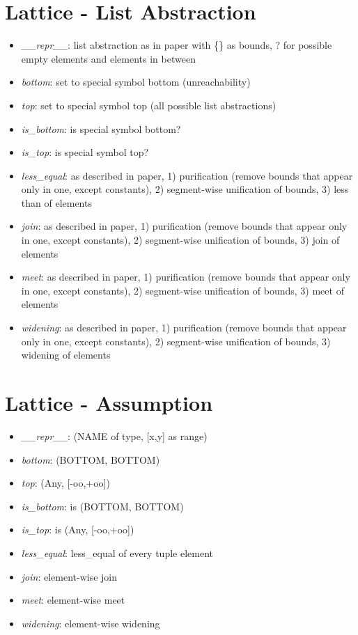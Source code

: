 \documentclass[11pt]{article}
\begin{document}
\section{Lattice - List Abstraction}

\begin{itemize}
\item \textit{\_\_repr\_\_}: list abstraction as in paper with \{\} as bounds, ? for possible empty elements and elements in between
\item \textit{bottom}: set to special symbol bottom (unreachability)
\item \textit{top}: set to special symbol top (all possible list abstractions)
\item \textit{is\_bottom}: is special symbol bottom?
\item \textit{is\_top}: is special symbol top?
\item \textit{less\_equal}: as described in paper, 1) purification (remove bounds that appear only in one, except constants), 2) segment-wise unification of bounds, 3) less than of elements
\item \textit{join}: as described in paper, 1) purification (remove bounds that appear only in one, except constants), 2) segment-wise unification of bounds, 3) join of elements
\item \textit{meet}: as described in paper, 1) purification (remove bounds that appear only in one, except constants), 2) segment-wise unification of bounds, 3) meet of elements
\item \textit{widening}: as described in paper, 1) purification (remove bounds that appear only in one, except constants), 2) segment-wise unification of bounds, 3) widening of elements
\end{itemize}

\section{Lattice - Assumption}

\begin{itemize}
\item \textit{\_\_repr\_\_}: (NAME of type, [x,y] as range)
\item \textit{bottom}: (BOTTOM, BOTTOM)
\item \textit{top}: (Any, [-oo,+oo])
\item \textit{is\_bottom}: is (BOTTOM, BOTTOM)
\item \textit{is\_top}: is (Any, [-oo,+oo])
\item \textit{less\_equal}: less\_equal of every tuple element
\item \textit{join}: element-wise join
\item \textit{meet}: element-wise meet
\item \textit{widening}: element-wise widening
\end{itemize}
\end{document}
